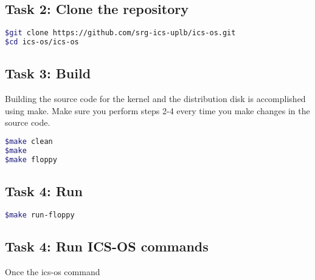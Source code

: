 \documentclass[a4paper, 11pt,oneside]{article}
\begin{document}
\subsection*{Task 2: Clone the repository}
\begin{lstlisting}[language=bash,frame=single] 
$git clone https://github.com/srg-ics-uplb/ics-os.git
$cd ics-os/ics-os
\end{lstlisting}

\subsection*{Task 3: Build}
Building the source code for the kernel and the distribution disk is accomplished using make. Make sure you perform steps 2-4 every time you make changes in the source code.
\begin{lstlisting}[language=bash,frame=single] 
$make clean
$make
$make floppy 
\end{lstlisting}

\subsection*{Task 4: Run}
\begin{lstlisting}[language=bash,frame=single] 
$make run-floppy 
\end{lstlisting}

\subsection*{Task 4: Run ICS-OS commands}
Once the ics-os command 

\end{document}
